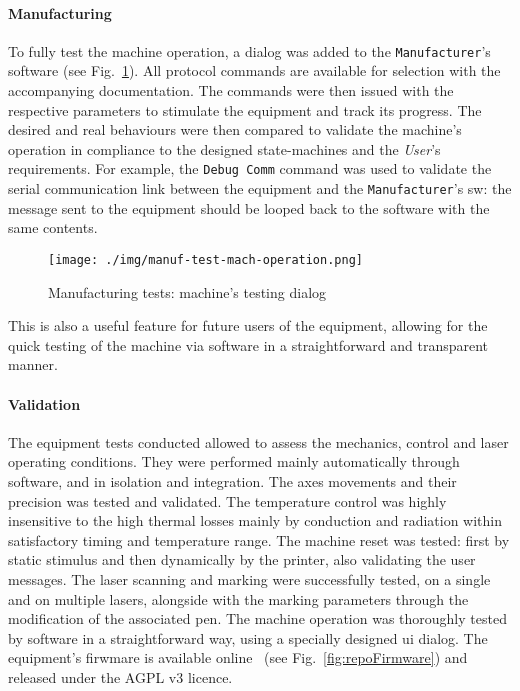 \paragraph{Manufacturing}
To fully test the machine operation, a dialog was added to the
\texttt{Manufacturer}'s software (see
Fig.~\ref{fig:manuf-test-mach-operation}). All protocol commands are available
for selection with the accompanying documentation. The commands were then issued
with the respective parameters to stimulate the equipment and track its
progress. The desired and real behaviours were then compared to validate the
machine's operation in compliance to the designed state-machines and the
\emph{User}'s requirements. For example, the \texttt{Debug Comm} command was
used to validate the serial communication link between the equipment and the
\texttt{Manufacturer}'s \gls{sw}: the message sent to the equipment should be
looped back to the software with the same contents.

\begin{figure}[!hbt]
  \centering
    \texttt{[image: ./img/manuf-test-mach-operation.png]}
  \caption{Manufacturing tests: machine's testing dialog}%
\label{fig:manuf-test-mach-operation}
\end{figure}

This is also a useful feature for future users of the equipment, allowing for
the quick testing of the machine via software in a straightforward and transparent manner.

\paragraph{Validation}
The equipment tests conducted allowed to assess the mechanics, control and laser operating conditions. They were performed mainly automatically
through software, and in isolation and integration. The
axes movements and their precision was tested and validated. The temperature
control was highly insensitive to the high thermal losses mainly by conduction
and radiation within satisfactory timing and temperature range. The machine
reset was tested: first by static stimulus and then dynamically by the printer,
also validating the user messages. The laser scanning and marking were
successfully tested, on a single and on multiple lasers, alongside with the marking parameters through the
modification of the associated pen. The machine operation was thoroughly tested
by software in a straightforward way, using a specially designed \gls{ui}
dialog.
The equipment's firwmare is available online~\cite{repoPostmanuf} (see Fig.~\ref{fig:repoFirmware}) and released
under the AGPL v3 licence.


